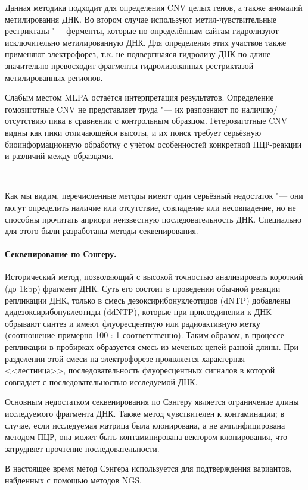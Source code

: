 \documentclass[a4paper,12pt]{article}
\begin{document}
Данная методика подходит для определения CNV целых генов, а также аномалий метилирования ДНК.
Во втором случае используют метил-чувствительные рестриктазы "--- ферменты, которые по определённым сайтам гидролизуют исключительно метилированную ДНК.
Для определения этих участков также применяют электрофорез, т.к. не подвергшаяся гидролизу ДНК по длине значительно превосходит фрагменты гидролизованных рестриктазой метилированных регионов.

Слабым местом MLPA остаётся интерпретация результатов.
Определение гомозиготные CNV не представляет труда "--- их разпознают по наличию/отсутствию пика в сравнении с контрольным образцом.
Гетерозиготные CNV видны как пики отличающейся высоты, и их поиск требует серьёзную биоинформационную обработку с учётом особенностей конкретной ПЦР-реакции и различий между образцами\cite{stuppia}.

~

Как мы видим, перечисленные методы имеют один серьёзный недостаток "--- они могут определить наличие или отсутствие, совпадение или несовпадение, но не способны прочитать априори неизвестную последовательность ДНК.
Специально для этого были разработаны методы секвенирования.

\paragraph{Секвенирование по Сэнгеру.}
Исторический метод, позволяющий с высокой точностью анализировать короткий (до 1kbp) фрагмент ДНК\cite{sanger}.
Суть его состоит в проведении обычной реакции репликации ДНК, только в смесь дезоксирибонуклеотидов (dNTP) добавлены дидезоксирибонуклеотиды (ddNTP), которые при присоединении к ДНК обрывают синтез и имеют флуоресцентную или радиоактивную метку (соотношение примерно 100 : 1 соответственно).
Таким образом, в процессе репликации в пробирках образуется смесь из меченых цепей разной длины.
При разделении этой смеси на электрофорезе проявляется характерная <<лестница>>, последовательность флуоресцентных сигналов в которой совпадает с последовательностью исследуемой ДНК.

Основным недостатком секвенирования по Сэнгеру является ограничение длины исследуемого фрагмента ДНК.
Также метод чувствителен к контаминации; в случае, если исследуемая матрица была клонирована, а не амплифицирована методом ПЦР, она может быть контаминирована вектором клонирования, что затрудняет прочтение последовательности.

В настоящее время метод Сэнгера используется для подтверждения вариантов, найденных с помощью методов NGS.
\end{document}
